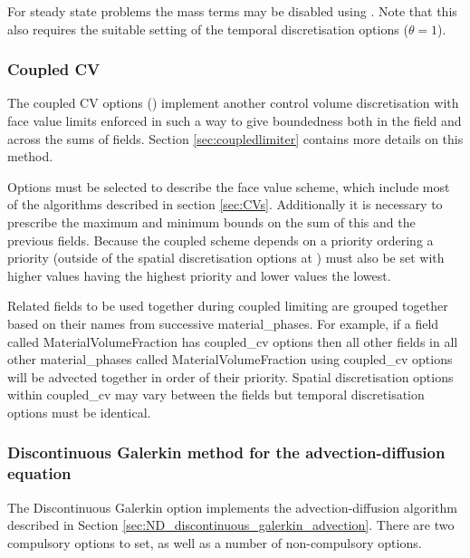 For steady state problems the mass terms may be disabled using .  Note that this also requires the suitable setting of the temporal discretisation options ($\theta=1$).

\subsubsection{Coupled CV}\label{sec:CoupledCVs}

The coupled CV options () implement another control volume discretisation with face value limits enforced in such a way to give boundedness both in the field and across the sums of fields.  Section \ref{sec:coupledlimiter} contains more details on this method.

Options must be selected to describe the face value scheme, which include most of the algorithms described in section \ref{sec:CVs}.  Additionally it is necessary to prescribe the maximum and minimum bounds on the sum of this and the previous fields.  Because the coupled scheme depends on a priority ordering a priority (outside of the spatial discretisation options at ) must also be set with higher values having the highest priority and lower values the lowest.

Related fields to be used together during coupled limiting are grouped together based on their names from successive material\_phases.  For example, if a field called MaterialVolumeFraction has coupled\_cv options then all other fields in all other material\_phases called MaterialVolumeFraction using coupled\_cv options will be advected together in order of their priority.  Spatial discretisation options within coupled\_cv may vary between the fields but temporal discretisation options must be identical.

\subsubsection{Discontinuous Galerkin method for the
  advection-diffusion equation}

The Discontinuous Galerkin option implements the advection-diffusion
algorithm described in Section
\ref{sec:ND_discontinuous_galerkin_advection}. There are two
compulsory options to set, as well as a number of non-compulsory options.

